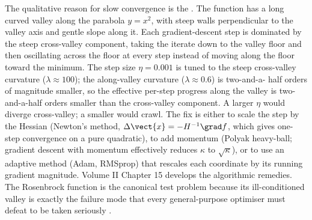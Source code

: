 \begin{exercise}
The qualitative reason for slow convergence is the
. The function has a long
curved valley along the parabola $y = x^{2}$, with steep walls
perpendicular to the valley axis and gentle slope along it. Each
gradient-descent step is dominated by the steep cross-valley
component, taking the iterate down to the valley floor and then
oscillating across the floor at every step instead of moving along
the floor toward the minimum. The step size $\eta = 0.001$ is
tuned to the steep cross-valley curvature ($\lambda \approx 100$);
the along-valley curvature ($\lambda \approx 0.6$) is two-and-a-
half orders of magnitude smaller, so the effective per-step
progress along the valley is two-and-a-half orders smaller than the
cross-valley component. A larger $\eta$ would diverge cross-valley;
a smaller would crawl. The fix is either to scale the step by the
Hessian (Newton's method, $\Delta\vect{x} = -H^{-1}\grad f$, which
gives one-step convergence on a pure quadratic), to add momentum
(Polyak heavy-ball; gradient descent with momentum effectively
reduces $\kappa$ to $\sqrt{\kappa}$), or to use an adaptive method
(Adam, RMSprop) that rescales each coordinate by its running
gradient magnitude. Volume II Chapter 15 develops the algorithmic
remedies. The Rosenbrock function is the canonical test problem
because its ill-conditioned valley is exactly the failure mode that
every general-purpose optimiser must defeat to be taken seriously
\cite{paper:v2c11-rosenbrock-1960}.
\end{exercise}

